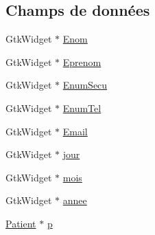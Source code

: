 \subsection*{Champs de données}
\begin{DoxyCompactItemize}
\item 
Gtk\-Widget $\ast$ \hyperlink{struct_data_ad897fb7c962d60832bc766fa99da9db9}{Enom}
\item 
Gtk\-Widget $\ast$ \hyperlink{struct_data_a7004a9a326ad19f493ca2f6f3cc4577c}{Eprenom}
\item 
Gtk\-Widget $\ast$ \hyperlink{struct_data_abd6fcac327f5f3b0629a93916e3c29da}{Enum\-Secu}
\item 
Gtk\-Widget $\ast$ \hyperlink{struct_data_ae300afceb0206bd32dc11312abd38df6}{Enum\-Tel}
\item 
Gtk\-Widget $\ast$ \hyperlink{struct_data_a1003606a7c4d6a289a7de796987f6efc}{Email}
\item 
Gtk\-Widget $\ast$ \hyperlink{struct_data_a366c31a9b090d9870030fe2ac52d6e46}{jour}
\item 
Gtk\-Widget $\ast$ \hyperlink{struct_data_a430ab7341bb11cda80f096a2ec12d8d7}{mois}
\item 
Gtk\-Widget $\ast$ \hyperlink{struct_data_a123c0853fe0470eb0a0f0af055eecc9f}{annee}
\item 
\hyperlink{struct_patient}{Patient} $\ast$ \hyperlink{struct_data_ab6da0510b3f88800fe3d3ee7e9cd9d7b}{p}
\end{DoxyCompactItemize}


